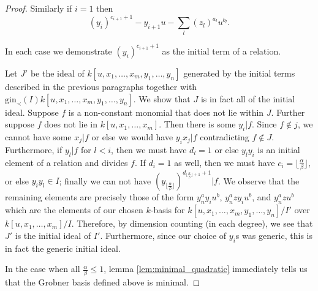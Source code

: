 \documentclass{amsart}
\theoremstyle{plain}
\theoremstyle{definition}
\theoremstyle{remark}
\numberwithin{equation}{section}
\newcommand \gin{\text{gin}}
\begin{document}
\begin{proof}
\noindent
Similarly if $i=1$ then
\[
	(y_i)^{c_{i+1}+1}-y_{i+1}u-\sum_l (z_l)^{a_l} u^{b_l}.
\]

\noindent
In each case we demonstrate $(y_i)^{c_{i+1}+1}$ as the initial term of a relation.  

Let $J'$ be the ideal of $k[u, x_1, \ldots, x_m, y_1, \ldots, y_n]$ generated by the initial 
terms described in the previous paragraphs together with $\gin_\prec(I)k[u, x_1, \ldots, 
x_m, y_1, \ldots, y_n]$.  We show that $J$ is in fact all of the initial ideal.  Suppose $f$ is a 
non-constant monomial that does not lie within $J$.  Further suppose $f$ does not lie in 
$k[u, x_1, \ldots, x_m]$.  Then there is some $y_i|f$.  Since $f\not\in j$, we cannot have 
some $x_j|f$ or else we would have $y_ix_j|f$ contradicting $f\not\in J$.  Furthermore, if 
$y_l|f$ for $l<i$, then we must have $d_l=1$ or else $y_ly_i$ is an initial element of a 
relation and divides $f$.  If $d_i=1$ as well, then we must have $c_i=\lfloor \frac{\alpha}
{\beta}\rfloor$, or else $y_iy_l\in I$; finally we can not have $(y_{\lfloor \frac{\alpha}{\beta}
\rfloor})^{d_{\lfloor \frac{\alpha}{\beta} \rfloor+1}+1}|f$.  We observe that the remaining 
elements are precisely those of the form $y_n^a y_i u^b$, $y_n^a zy_iu^b$, and $y_n^a z 
u^b$ which are the elements of our chosen $k$-basis for $k[u, x_1, \ldots, x_m, y_1, \ldots, 
y_n]/I'$ over $k[u, x_1, \ldots, x_m]/I$.  Therefore, by dimension counting (in each degree), 
we see that $J'$ is the initial ideal of $I'$.  Furthermore, since our choice of $y_i$s was 
generic, this is in fact the generic initial ideal.

In the case when all $\frac{\alpha}{\beta}\le 1$, lemma \ref{lem:minimal_quadratic} immediately tells us that the Grobner basis defined above is minimal.
\end{proof}
\end{document}
